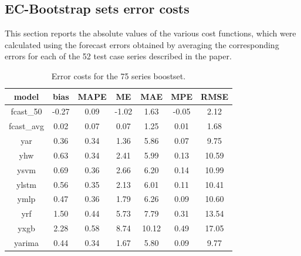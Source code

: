 \documentclass[ijoc,nonblindrev]{informs4}
\begin{document}
\begin{APPENDICES}
	\section{EC-Bootstrap sets error costs} \label{app:errcost}
	
	This section reports the absolute values of the various cost functions, which were calculated using the forecast errors obtained by averaging the corresponding errors for each of the 52 test case series described in the paper.
	
	\begin{table}[h]
		\centering
		\renewcommand{\arraystretch}{0.8}
		\begin{tabular}{ccccccc}
			model & bias & MAPE & ME & MAE & MPE & RMSE \\
			\hline
			fcast\_50   &-0.27 & 0.09 &-1.02 & 1.63 &-0.05 &  2.12 \\
			fcast\_avg  & 0.02 & 0.07 & 0.07 & 1.25 & 0.01 &  1.68 \\
			yar         & 0.36 & 0.34 & 1.36 & 5.86 & 0.07 &  9.75 \\
			yhw         & 0.63 & 0.34 & 2.41 & 5.99 & 0.13 & 10.59 \\
			ysvm        & 0.69 & 0.36 & 2.66 & 6.20 & 0.14 & 10.99 \\
			ylstm       & 0.56 & 0.35 & 2.13 & 6.01 & 0.11 & 10.41 \\
			ymlp        & 0.47 & 0.36 & 1.79 & 6.26 & 0.09 & 10.60 \\
			yrf         & 1.50 & 0.44 & 5.73 & 7.79 & 0.31 & 13.54 \\
			yxgb        & 2.28 & 0.58 & 8.74 &10.12 & 0.49 & 17.05 \\
			yarima      & 0.44 & 0.34 & 1.67 & 5.80 & 0.09 &  9.77 \\
			\hline
		\end{tabular}
		\caption{Error costs for the 75 series boostset.}
		\label{table:app75}
	\end{table}
	

\end{APPENDICES}
\end{document}
